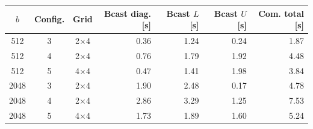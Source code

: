 \begin{tabular}{cccrrrr}
\toprule
$b$ & Config. & Grid & Bcast diag. [s] & Bcast $L$ [s] & Bcast $U$ [s] & Com. total [s] \\
\midrule
512 & 3 & 2$\times$4 & 0.36 & 1.24 & 0.24 & 1.87 \\
512 & 4 & 2$\times$4 & 0.76 & 1.79 & 1.92 & 4.48 \\
512 & 5 & 4$\times$4 & 0.47 & 1.41 & 1.98 & 3.84 \\
2048 & 3 & 2$\times$4 & 1.90 & 2.48 & 0.17 & 4.78 \\
2048 & 4 & 2$\times$4 & 2.86 & 3.29 & 1.25 & 7.53 \\
2048 & 5 & 4$\times$4 & 1.73 & 1.89 & 1.60 & 5.24 \\
\bottomrule
\end{tabular}
